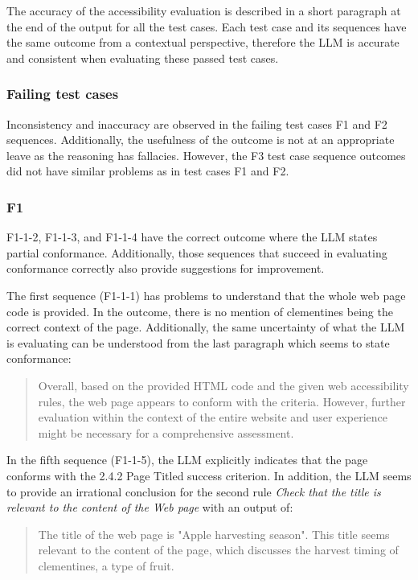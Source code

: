 The accuracy of the accessibility evaluation is described in a short paragraph at the end of the output for all the test cases. Each test case and its sequences have the same outcome from a contextual perspective, therefore the LLM is accurate and consistent when evaluating these passed test cases.

\subsubsection{Failing test cases}

Inconsistency and inaccuracy are observed in the failing test cases F1 and F2 sequences. Additionally, the usefulness of the outcome is not at an appropriate leave as the reasoning has fallacies. However, the F3 test case sequence outcomes did not have similar problems as in test cases F1 and F2.

\subsubsection{F1}

F1-1-2, F1-1-3, and F1-1-4 have the correct outcome where the LLM states partial conformance. Additionally, those sequences that succeed in evaluating conformance correctly also provide suggestions for improvement. 

The first sequence (F1-1-1) has problems to understand that the whole web page code is provided. In the outcome, there is no mention of clementines being the correct context of the page. Additionally, the same uncertainty of what the LLM is evaluating can be understood from the last paragraph which seems to state conformance:

\blockquote{Overall, based on the provided HTML code and the given web accessibility rules, the web page appears to conform with the criteria. However, further evaluation within the context of the entire website and user experience might be necessary for a comprehensive assessment.}

In the fifth sequence (F1-1-5), the LLM explicitly indicates that the page conforms with the 2.4.2 Page Titled success criterion. In addition, the LLM seems to provide an irrational conclusion for the second rule \textit{Check that the title is relevant to the content of the Web page} with an output of:

\blockquote{The title of the web page is "Apple harvesting season". This title seems relevant to the content of the page, which discusses the harvest timing of clementines, a type of fruit.}

